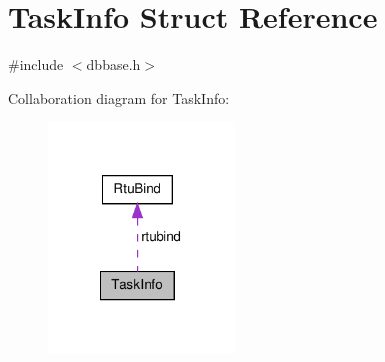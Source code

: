 \hypertarget{structTaskInfo}{\section{Task\-Info Struct Reference}
\label{structTaskInfo}
}


{\ttfamily \#include $<$dbbase.\-h$>$}



Collaboration diagram for Task\-Info\-:\nopagebreak
\begin{figure}[H]
\begin{center}
\leavevmode
\includegraphics[width=140pt]{structTaskInfo__coll__graph}
\end{center}
\end{figure}
